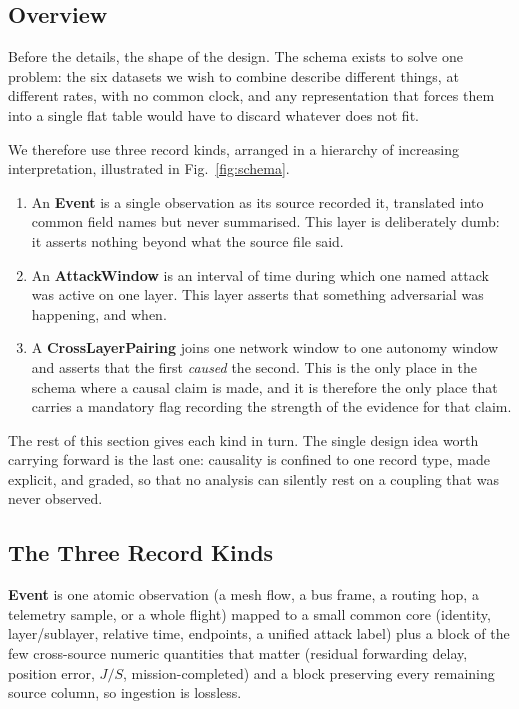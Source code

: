 \subsection{Overview}
Before the details, the shape of the design. The schema exists to solve one
problem: the six datasets we wish to combine describe different things, at
different rates, with no common clock, and any representation that forces them
into a single flat table would have to discard whatever does not fit.

We therefore use three record kinds, arranged in a hierarchy of increasing
interpretation, illustrated in Fig.~\ref{fig:schema}.

\begin{enumerate}
\item An \textbf{Event} is a single observation as its source recorded it,
translated into common field names but never summarised. This layer is
deliberately dumb: it asserts nothing beyond what the source file said.
\item An \textbf{AttackWindow} is an interval of time during which one named
attack was active on one layer. This layer asserts that something adversarial
was happening, and when.
\item A \textbf{CrossLayerPairing} joins one network window to one autonomy
window and asserts that the first \emph{caused} the second. This is the only
place in the schema where a causal claim is made, and it is therefore the only
place that carries a mandatory flag recording the strength of the evidence for
that claim.
\end{enumerate}

The rest of this section gives each kind in turn. The single design idea worth
carrying forward is the last one: causality is confined to one record type, made
explicit, and graded, so that no analysis can silently rest on a coupling that
was never observed.

\subsection{The Three Record Kinds}
\textbf{Event} is one atomic observation (a mesh flow, a bus frame, a routing
hop, a telemetry sample, or a whole flight) mapped to a small common core
(identity, layer/sublayer, relative time, endpoints, a unified attack label)
plus a  block of the few cross-source numeric quantities that
matter (residual forwarding delay, position error, $J/S$, mission-completed) and
a  block preserving every remaining source column, so ingestion is
lossless.

